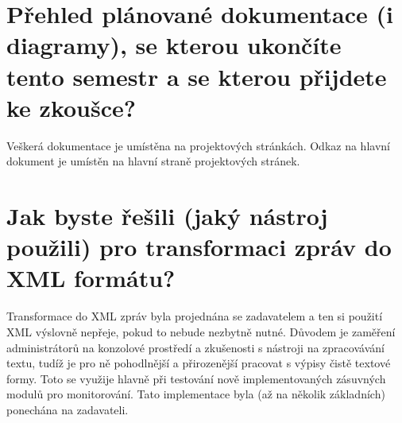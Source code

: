 \documentclass[12pt]{article}
\begin{document}
\section{Přehled plánované dokumentace (i diagramy), se kterou ukončíte tento
semestr a se kterou přijdete ke zkoušce?}
Veškerá dokumentace je umístěna na projektových stránkách. Odkaz na hlavní
dokument je umístěn na hlavní straně projektových stránek.

\section{Jak byste řešili (jaký nástroj použili) pro transformaci zpráv do XML
formátu?}
Transformace do XML zpráv byla projednána se zadavatelem a ten si použití XML
výslovně nepřeje, pokud to nebude nezbytně nutné. Důvodem je zaměření
administrátorů na konzolové prostředí a zkušenosti s nástroji na zpracovávání
textu, tudíž je pro ně pohodlnější a přirozenější pracovat s výpisy čistě
textové formy. Toto se využije hlavně při testování nově implementovaných zásuvných
modulů pro monitorování. Tato implementace byla (až na několik základních)
ponechána na zadavateli.
\end{document}
